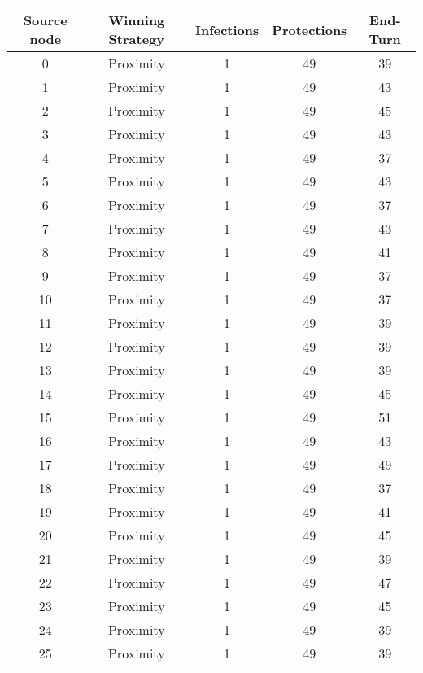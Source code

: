 \documentclass[results.tex]{subfiles}
\begin{document}
\begin{center}
  \begin{tabular}{| c || c | c | c | c |}
    \hline
    {\bfseries Source node} & {\bfseries Winning Strategy} & {\bfseries Infections} & {\bfseries Protections} & {\bfseries End-Turn} \\  %
    \hline\hline
    0 & Proximity & 1 & 49 & 39 \\ 
    \hline
    1 & Proximity & 1 & 49 & 43 \\ 
    \hline
    2 & Proximity & 1 & 49 & 45 \\ 
    \hline
    3 & Proximity & 1 & 49 & 43 \\ 
    \hline
    4 & Proximity & 1 & 49 & 37 \\ 
    \hline
    5 & Proximity & 1 & 49 & 43 \\ 
    \hline
    6 & Proximity & 1 & 49 & 37 \\ 
    \hline
    7 & Proximity & 1 & 49 & 43 \\ 
    \hline
    8 & Proximity & 1 & 49 & 41 \\ 
    \hline
    9 & Proximity & 1 & 49 & 37 \\ 
    \hline
    10 & Proximity & 1 & 49 & 37 \\ 
    \hline
    11 & Proximity & 1 & 49 & 39 \\ 
    \hline
    12 & Proximity & 1 & 49 & 39 \\ 
    \hline
    13 & Proximity & 1 & 49 & 39 \\ 
    \hline
    14 & Proximity & 1 & 49 & 45 \\ 
    \hline
    15 & Proximity & 1 & 49 & 51 \\ 
    \hline
    16 & Proximity & 1 & 49 & 43 \\ 
    \hline
    17 & Proximity & 1 & 49 & 49 \\ 
    \hline
    18 & Proximity & 1 & 49 & 37 \\ 
    \hline
    19 & Proximity & 1 & 49 & 41 \\ 
    \hline
    20 & Proximity & 1 & 49 & 45 \\ 
    \hline
    21 & Proximity & 1 & 49 & 39 \\ 
    \hline
    22 & Proximity & 1 & 49 & 47 \\ 
    \hline
    23 & Proximity & 1 & 49 & 45 \\ 
    \hline
    24 & Proximity & 1 & 49 & 39 \\ 
    \hline
    25 & Proximity & 1 & 49 & 39 \\ 

\end{tabular}
\end{center}
\end{document}
